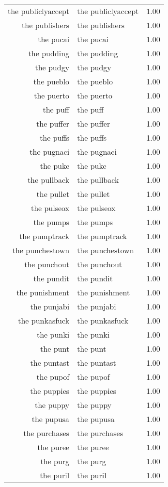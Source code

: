 \begin{table}[ht]
\begin{tabular}{rlr}
  the publiclyaccept & the publiclyaccept & 1.00 \\ 
  the publishers & the publishers & 1.00 \\ 
  the pucai & the pucai & 1.00 \\ 
  the pudding & the pudding & 1.00 \\ 
  the pudgy & the pudgy & 1.00 \\ 
  the pueblo & the pueblo & 1.00 \\ 
  the puerto & the puerto & 1.00 \\ 
  the puff & the puff & 1.00 \\ 
  the puffer & the puffer & 1.00 \\ 
  the puffs & the puffs & 1.00 \\ 
  the pugnaci & the pugnaci & 1.00 \\ 
  the puke & the puke & 1.00 \\ 
  the pullback & the pullback & 1.00 \\ 
  the pullet & the pullet & 1.00 \\ 
  the pulseox & the pulseox & 1.00 \\ 
  the pumps & the pumps & 1.00 \\ 
  the pumptrack & the pumptrack & 1.00 \\ 
  the punchestown & the punchestown & 1.00 \\ 
  the punchout & the punchout & 1.00 \\ 
  the pundit & the pundit & 1.00 \\ 
  the punishment & the punishment & 1.00 \\ 
  the punjabi & the punjabi & 1.00 \\ 
  the punkasfuck & the punkasfuck & 1.00 \\ 
  the punki & the punki & 1.00 \\ 
  the punt & the punt & 1.00 \\ 
  the puntast & the puntast & 1.00 \\ 
  the pupof & the pupof & 1.00 \\ 
  the puppies & the puppies & 1.00 \\ 
  the puppy & the puppy & 1.00 \\ 
  the pupusa & the pupusa & 1.00 \\ 
  the purchases & the purchases & 1.00 \\ 
  the puree & the puree & 1.00 \\ 
  the purg & the purg & 1.00 \\ 
  the puril & the puril & 1.00 \\ 

\end{tabular}
\end{table}
